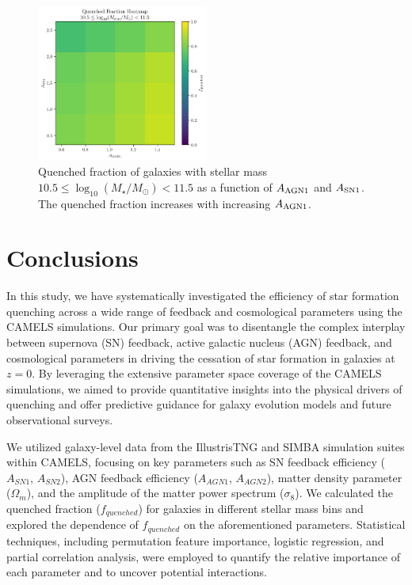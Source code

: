 \documentclass[twocolumn]{aastex631}
\begin{document}
\begin{figure}[h!]
    \centering
    \includegraphics[width=0.5\textwidth]{../Project6/plots/fquenched_heatmap_SN1_AGN1_10_5_10_M_star_M_11_5_20250424_133935.png}
    \caption{\label{fig:heatmap_fquenched_3} Quenched fraction of galaxies with stellar mass $10.5 \leq \log_{10}(M_{\star}/M_{\odot}) < 11.5$ as a function of $A_{\rm AGN1}$ and $A_{\rm SN1}$. The quenched fraction increases with increasing $A_{\rm AGN1}$.
}
\end{figure}

\section{Conclusions}
\label{sec:conclusions}


In this study, we have systematically investigated the efficiency of star formation quenching across a wide range of feedback and cosmological parameters using the CAMELS simulations. Our primary goal was to disentangle the complex interplay between supernova (SN) feedback, active galactic nucleus (AGN) feedback, and cosmological parameters in driving the cessation of star formation in galaxies at $z=0$. By leveraging the extensive parameter space coverage of the CAMELS simulations, we aimed to provide quantitative insights into the physical drivers of quenching and offer predictive guidance for galaxy evolution models and future observational surveys.

We utilized galaxy-level data from the IllustrisTNG and SIMBA simulation suites within CAMELS, focusing on key parameters such as SN feedback efficiency (\(A_{SN1}\), \(A_{SN2}\)), AGN feedback efficiency (\(A_{AGN1}\), \(A_{AGN2}\)), matter density parameter (\(\Omega_m\)), and the amplitude of the matter power spectrum (\(\sigma_8\)). We calculated the quenched fraction (\(f_{quenched}\)) for galaxies in different stellar mass bins and explored the dependence of \(f_{quenched}\) on the aforementioned parameters. Statistical techniques, including permutation feature importance, logistic regression, and partial correlation analysis, were employed to quantify the relative importance of each parameter and to uncover potential interactions.
\end{document}

